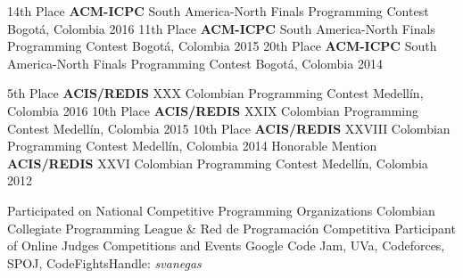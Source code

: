 \begin{cvhonors}
  \cvhonor
    {14th Place}
    {\textbf{ACM-ICPC} South America-North Finals Programming Contest}
    {Bogotá, Colombia}
    {2016}
  \cvhonor
    {11th Place}
    {\textbf{ACM-ICPC} South America-North Finals Programming Contest}
    {Bogotá, Colombia}
    {2015}
  \cvhonor
    {20th Place}
    {\textbf{ACM-ICPC} South America-North Finals Programming Contest}
    {Bogotá, Colombia}
    {2014}
\end{cvhonors}

\begin{cvhonors}
  \cvhonor
    {5th Place}
    {\textbf{ACIS/REDIS} XXX Colombian Programming Contest}
    {Medellín, Colombia}
    {2016}
  \cvhonor
    {10th Place}
    {\textbf{ACIS/REDIS} XXIX Colombian Programming Contest}
    {Medellín, Colombia}
    {2015}
  \cvhonor
    {10th Place}
    {\textbf{ACIS/REDIS} XXVIII Colombian Programming Contest}
    {Medellín, Colombia}
    {2014}
  \cvhonor
    {Honorable Mention}
    {\textbf{ACIS/REDIS} XXVI Colombian Programming Contest}
    {Medellín, Colombia}
    {2012}
\end{cvhonors}

\begin{cvhonors}
  \cvhonor
    {Participated on National Competitive Programming Organizations}
    {Colombian Collegiate Programming League \& Red de Programación Competitiva}
    {}
    {}
  \cvhonor
    {Participant of Online Judges Competitions and Events}
    {Google Code Jam, UVa, Codeforces, SPOJ, CodeFights{\dotsep}Handle: \textit{svanegas}}
    {}
    {}
\end{cvhonors}
